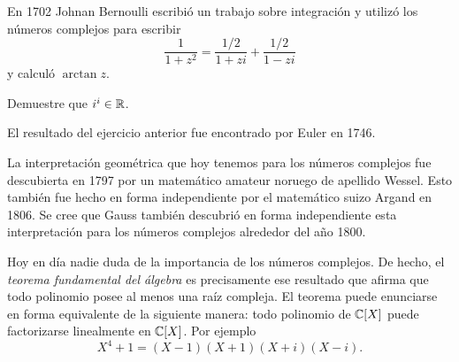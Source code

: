 En 1702 Johnan Bernoulli escribió un trabajo sobre integración y utilizó los
números complejos para escribir
\[
	\frac{1}{1+z^2}=\frac{1/2}{1+zi}+\frac{1/2}{1-zi}
\]
y calculó $\arctan z$. 

\begin{exercise}
	Demuestre que $i^i\in\mathbb{R}$. 
\end{exercise}

El resultado del ejercicio anterior fue encontrado por Euler 
en 1746.

La interpretación geométrica que hoy tenemos para los números complejos fue
descubierta en 1797 por un matemático amateur noruego de apellido Wessel. Esto
también fue hecho en forma independiente por el matemático suizo Argand en
1806. Se cree que Gauss también descubrió en forma independiente esta
interpretación para los números complejos alrededor del año 1800.

Hoy en día nadie duda de la importancia de los números complejos. De hecho, el
\emph{teorema fundamental del álgebra} es precisamente ese resultado que afirma
que todo polinomio posee al menos una raíz compleja. El teorema puede
enunciarse en forma equivalente de la siguiente manera: todo polinomio de
$\mathbb{C}[X]$ puede factorizarse linealmente en $\mathbb{C}[X]$. Por ejemplo
\[
	X^4+1=(X-1)(X+1)(X+i)(X-i).
\]

